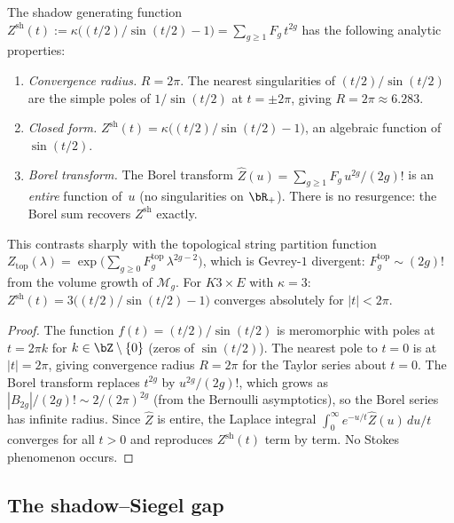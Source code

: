 \begin{proposition}
\label{prop:shadow-gf-convergence}
The shadow generating function
$Z^{\mathrm{sh}}(t) := \kappa\bigl((t/2)/\sin(t/2) - 1\bigr)
= \sum_{g \geq 1} F_g\,t^{2g}$ has the following analytic
properties:
\begin{enumerate}[label=\textup{(\roman*)}]
\item \emph{Convergence radius.}
$R = 2\pi$. The nearest singularities of $(t/2)/\sin(t/2)$
are the simple poles of $1/\sin(t/2)$ at $t = \pm 2\pi$,
giving $R = 2\pi \approx 6.283$.
\item \emph{Closed form.}
$Z^{\mathrm{sh}}(t) = \kappa\bigl((t/2)/\sin(t/2) - 1\bigr)$,
an algebraic function of~$\sin(t/2)$.
\item \emph{Borel transform.}
The Borel transform $\hat{Z}(u)
= \sum_{g \geq 1} F_g\,u^{2g}/(2g)!$ is an
\emph{entire} function of~$u$ \textup{(}no singularities
on $\bR_+$\textup{)}. There is no resurgence: the
Borel sum recovers $Z^{\mathrm{sh}}$ exactly.
\end{enumerate}
This contrasts sharply with the topological string partition
function $Z_{\mathrm{top}}(\lambda) = \exp\bigl(\sum_{g \geq 0}
F_g^{\mathrm{top}}\,\lambda^{2g-2}\bigr)$, which is
Gevrey-$1$ divergent: $F_g^{\mathrm{top}} \sim (2g)!$ from
the volume growth of $\mathcal{M}_g$.
For $K3 \times E$ with $\kappa = 3$:
$Z^{\mathrm{sh}}(t) = 3\bigl((t/2)/\sin(t/2) - 1\bigr)$
converges absolutely for $|t| < 2\pi$.
\end{proposition}

\begin{proof}
The function $f(t) = (t/2)/\sin(t/2)$ is meromorphic with poles
at $t = 2\pi k$ for $k \in \bZ \setminus \{0\}$ (zeros of
$\sin(t/2)$). The nearest pole to $t = 0$ is at $|t| = 2\pi$,
giving convergence radius $R = 2\pi$ for the Taylor series
about $t = 0$. The Borel transform replaces $t^{2g}$ by
$u^{2g}/(2g)!$, which grows as $|B_{2g}|/(2g)! \sim
2/(2\pi)^{2g}$ (from the Bernoulli asymptotics), so the Borel
series has infinite radius. Since $\hat{Z}$ is entire, the
Laplace integral $\int_0^\infty e^{-u/t}\hat{Z}(u)\,du/t$
converges for all $t > 0$ and reproduces $Z^{\mathrm{sh}}(t)$
term by term. No Stokes phenomenon occurs.
\end{proof}

\subsection{The shadow--Siegel gap}
\label{subsec:shadow-siegel-gap}

